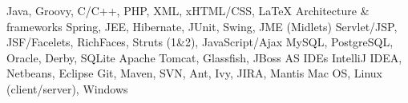 
\cvcomputer
	{} {Java, Groovy, C/C++, PHP, XML, xHTML/CSS, \LaTeX}
	{Architecture \& frameworks} {Spring, JEE, Hibernate, JUnit, Swing, JME (Midlets)}
\cvcomputer
	{} {Servlet/JSP, JSF/Facelets, RichFaces, Struts (1\&2), JavaScript/Ajax}
	{} {MySQL, PostgreSQL, Oracle, Derby, SQLite}
\cvcomputer
	{} {Apache Tomcat, Glassfish, JBoss AS}
	{IDEs} {IntelliJ IDEA, Netbeans, Eclipse}
\cvcomputer
	{} {Git, Maven, SVN, Ant, Ivy, JIRA, Mantis}
	{} {Mac OS, Linux (client/server), Windows}